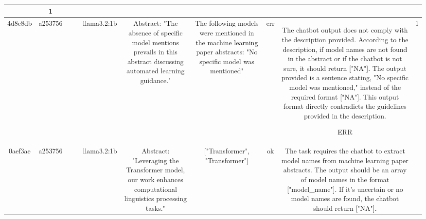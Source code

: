 \begin{table}[h!]
\begin{tabular}{|c|c|c|c|c|c|c|c|c|c|}
\[\[\[\[\[1. **Duplicate Entries**: The array contains the same model name "Fuzzy Logic" twice, which can suggest redundancy and potentially non-compliance with what would be expected from extracted model names. However, the description does not explicitly state that model names should appear only once in the array.

2. **Format Compliance**: The output is formatted as an array of strings, which complies with the stipulated output format. 

3. **Model Name Specification**: Without knowing the input abstract, it is not possible to determine if "Fuzzy Logic" appears as a model name in the text or if the chatbot is uncertain and should have returned ["NA"]. Hence, we cannot evaluate this part for compliance.

4. **Assumption of Compliance**: Since we are to assume compliance where the description is ambiguous or does not specify otherwise (like repeated entries), unless explicitly stated that duplicates are not allowed, it is difficult to claim a direct violation on that basis alone.

Taking into account that we cannot ascertain the correctness related to the input and that the format is compliant, while assuming that duplicates, unless specified otherwise, do not necessarily imply a violation, the output appears to be within the given directives as per the evaluation guidelines specified.

No violation.
OK & 1\\
\hline
4d8e8db & a253756 &  &  & llama3.2:1b & Abstract: "The absence of specific model mentions prevails in this abstract discussing automated learning guidance." & The following models were mentioned in the machine learning paper abstracts:
"No specific model was mentioned" & err & The chatbot output does not comply with the description provided. According to the description, if model names are not found in the abstract or if the chatbot is not sure, it should return ["NA"]. The output provided is a sentence stating, "No specific model was mentioned," instead of the required format ["NA"]. This output format directly contradicts the guidelines provided in the description.

ERR & 1\\
\hline
0aef3ae & a253756 &  &  & llama3.2:1b & Abstract: "Leveraging the Transformer model, our work enhances computational linguistics processing tasks." & ["Transformer", "Transformer"] & ok & The task requires the chatbot to extract model names from machine learning paper abstracts. The output should be an array of model names in the format ["model_name"]. If it's uncertain or no model names are found, the chatbot should return ["NA"]. 

\]\]\]\]\]
\end{tabular}
\end{table}
